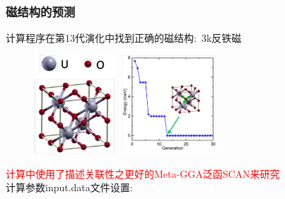 \documentclass[cjk,slidestop,compress,mathserif,blue]{beamer}
\begin{document}
\frame
{
	\frametitle{\textrm{}磁结构的预测}
	计算程序在第13代演化中找到\textrm{}正确的磁结构:~\textrm{3k}反铁磁
\begin{figure}[h!]
\vspace*{-0.08in}
\centering
\includegraphics[height=1.45in,width=1.20in]{Figures/UO2-struct.png}
\hskip 0.5pt
\includegraphics[height=1.45in,width=1.50in]{Figures/UO2-Generation.png}
\label{Fig:FeSe-Generation}
\end{figure}
\textcolor{red}{\tiny{计算中使用了描述关联性之更好的\textrm{Meta-GGA}泛函\textrm{SCAN}来研究\textrm{}}}\\
\vskip 0.08in
\centering
计算参数\textrm{input.data}文件设置:\\
}
\appendix
\frame
\end{document}
